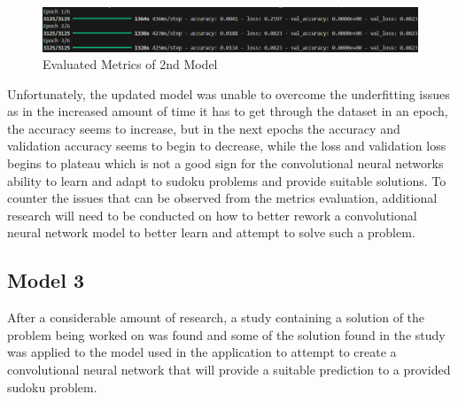 \documentclass[]{final_report}
\begin{document}
\begin{figure}[ht]
    \centering 
    \begin{minipage}{1.1\textwidth} 
        \includegraphics[width=\textwidth]{images/2nd model metrics.png} 
        \caption{Evaluated Metrics of 2nd Model} 
        \label{fig: Evaluated Metrics of 2nd Model} 
    \end{minipage} 
    \hfill 
\end{figure}

Unfortunately, the updated model was unable to overcome the underfitting issues as in the increased amount of time it has to get through the dataset in an epoch, the accuracy seems to increase, but in the next epochs the accuracy and validation accuracy seems to begin to decrease, while the loss and validation loss begins to plateau which is not a good sign for the convolutional neural networks ability to learn and adapt to sudoku problems and provide suitable solutions. To counter the issues that can be observed from the metrics evaluation, additional research will need to be conducted on how to better rework a convolutional neural network model to better learn and attempt to solve such a problem.

\subsection{Model 3}

After a considerable amount of research, a study containing a solution of the problem being worked on was found and some of the solution found in the study was applied to the model used in the application to attempt to create a convolutional neural network that will provide a suitable prediction to a provided sudoku problem. 
\end{document}
